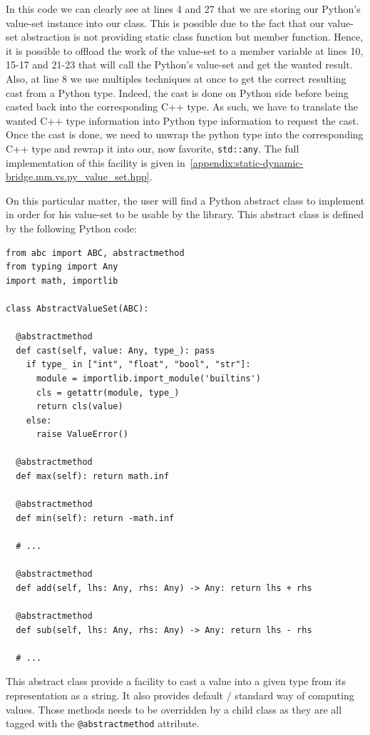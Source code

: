 In this code we can clearly see at lines 4 and 27 that we are storing our Python's value-set instance into our class.
This is possible due to the fact that our value-set abstraction is not providing static class function but member
function. Hence, it is possible to offload the work of the value-set to a member variable at lines 10, 15-17 and 21-23
that will call the Python's value-set and get the wanted result. Also, at line 8 we use multiples techniques at once to
get the correct resulting cast from a Python type. Indeed, the cast is done on Python side before being casted back into
the corresponding C++ type. As such, we have to translate the wanted C++ type information into Python type information
to request the cast. Once the cast is done, we need to unwrap the python type into the corresponding C++ type and rewrap
it into our, now favorite, \texttt{std::any}. The full implementation of this facility is given
in~\cref{appendix:static-dynamic-bridge.mm.vs.py_value_set.hpp}.

On this particular matter, the user will find a Python abstract class to implement in order for his value-set to be
usable by the library. This abstract class is defined by the following Python code:

\begin{verbatim}
from abc import ABC, abstractmethod
from typing import Any
import math, importlib

class AbstractValueSet(ABC):

  @abstractmethod
  def cast(self, value: Any, type_): pass
    if type_ in ["int", "float", "bool", "str"]:
      module = importlib.import_module('builtins')
      cls = getattr(module, type_)
      return cls(value)
    else:
      raise ValueError()

  @abstractmethod
  def max(self): return math.inf

  @abstractmethod
  def min(self): return -math.inf

  # ...

  @abstractmethod
  def add(self, lhs: Any, rhs: Any) -> Any: return lhs + rhs

  @abstractmethod
  def sub(self, lhs: Any, rhs: Any) -> Any: return lhs - rhs

  # ...
\end{verbatim}

This abstract class provide a facility to cast a value into a given type from its representation as a string. It also
provides default / standard way of computing values. Those methods needs to be overridden by a child class as they are
all tagged with the \texttt{@abstractmethod} attribute.

